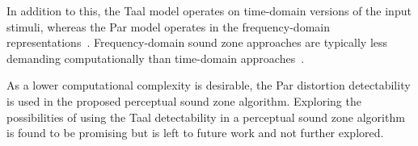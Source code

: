 In addition to this, the Taal model operates on time-domain versions of the input stimuli, whereas the Par model operates in the frequency-domain representations~\cite{van2005perceptual, taal2012low}.
Frequency-domain sound zone approaches are typically less demanding computationally than time-domain approaches~\cite{vindrola2019personal}.

As a lower computational complexity is desirable, the Par distortion detectability is used in the proposed perceptual sound zone algorithm.
Exploring the possibilities of using the Taal detectability in a perceptual sound zone algorithm is found to be promising but is left to future work and not further explored.
